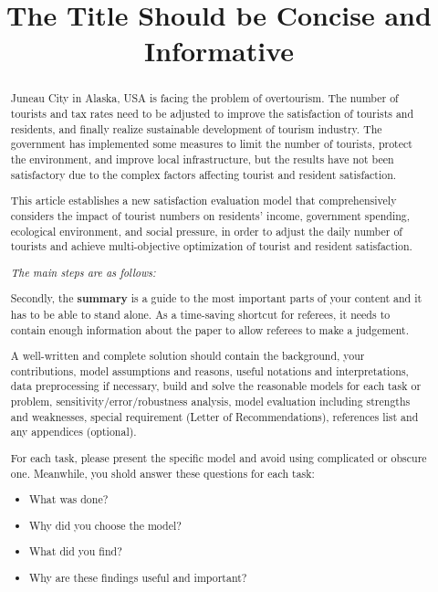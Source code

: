 \documentclass[12pt]{article}  %
\title{The Title Should be Concise and Informative}  %
\begin{document}
 
 \begin{abstract}
Juneau City in Alaska, USA is facing the problem of overtourism. The number of tourists and tax rates need to be adjusted to improve the satisfaction of tourists and residents, and finally realize sustainable development of tourism industry. The government has implemented some measures to limit the number of tourists, protect the environment, and improve local infrastructure, but the results have not been satisfactory due to the complex factors affecting tourist and resident satisfaction.
     
This article establishes a new satisfaction evaluation model that comprehensively considers the impact of tourist numbers on residents' income, government spending, ecological environment, and social pressure, in order to adjust the daily number of tourists and achieve multi-objective optimization of tourist and resident satisfaction.

\textit{The main steps are as follows:}
 
 Secondly, the \textbf{summary} is a guide to the most important parts of your content and it has to be able to stand alone. As a time-saving shortcut for referees, it needs to contain enough information about the paper to allow referees to make a judgement. 
   
 A well-written and complete solution should contain the background, your contributions, model assumptions and reasons, useful notations and interpretations, data preprocessing if necessary, build and solve the reasonable models for each task or problem, sensitivity/error/robustness analysis, model evaluation including strengths and weaknesses, special requirement (Letter of Recommendations), references list and any appendices (optional). 
 
 For each task, please present the specific model and avoid using complicated or obscure one. Meanwhile, you shold answer these questions for each task:
 \begin{itemize}
     \setlength{\parsep}{0ex} %
     \setlength{\topsep}{2ex} %
     \setlength{\itemsep}{1ex} %
     \item What was done?
     \item Why did you choose the model?
     \item What did you find?
     \item Why are these findings useful and important?
 \end{itemize}
 

\end{abstract}
\end{document}
